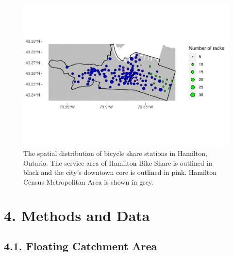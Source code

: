 \documentclass[]{elsarticle} %
\begin{document}
\begin{figure}

{\centering \includegraphics[width=1\linewidth]{Bike-share-spatial-equity_files/figure-latex/sobi-stations-in-hamilton-1} 

}

\caption{The spatial distribution of bicycle share stations in Hamilton, Ontario. The service area of Hamilton Bike Share is outlined in black and the city's downtown core is outlined in pink. Hamilton Census Metropolitan Area is shown in grey.}\label{fig:sobi-stations-in-hamilton}
\end{figure}

\hypertarget{sec:methods}{%
\section{4. Methods and Data}\label{sec:methods}}

\hypertarget{floating-catchment-area}{%
\subsection{4.1. Floating Catchment
Area}\label{floating-catchment-area}}
\end{document}
